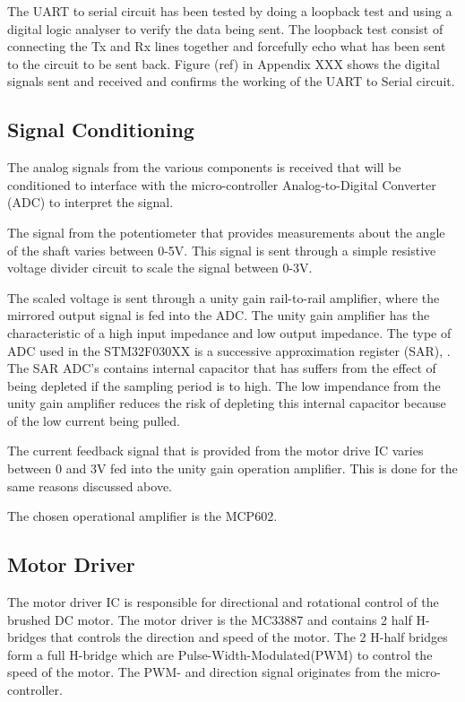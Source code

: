 \documentclass[a4paper,12pt]{article}
\begin{document}
	
	The UART to serial circuit has been tested by doing a loopback test and using a digital logic analyser to verify the data being sent. The loopback test consist of connecting the Tx and Rx lines together and forcefully echo what has been sent to the circuit to be sent back. Figure (ref) in Appendix XXX shows the digital signals sent and received and confirms the working of the UART to Serial circuit.
	
	\subsection{Signal Conditioning}
	
	The analog signals from the various components is received that will be conditioned to interface with the micro-controller Analog-to-Digital Converter (ADC) to interpret the signal.
	
	The signal from the potentiometer that provides measurements about the angle of the shaft varies between 0-5V. This signal is sent through a simple resistive voltage divider circuit to scale the signal between 0-3V. 
	
	The scaled voltage is sent through a unity gain rail-to-rail amplifier, where the mirrored output signal is fed into the ADC. The unity gain amplifier has the characteristic of a high input impedance and low output impedance. The type of ADC used in the STM32F030XX is a successive approximation register (SAR), \cite{stm32_ADC:2017}. The SAR ADC's contains internal capacitor that has suffers from the effect of being depleted if the sampling period is to high. The low impendance from the unity gain amplifier reduces the risk of depleting this internal capacitor because of the low current being pulled.
	
	The current feedback signal that is provided from the motor drive IC varies between 0 and 3V fed into the unity gain operation amplifier. This is done for the same reasons discussed above.
	
	The chosen operational amplifier is the MCP602. 
	
	\subsection{Motor Driver}
	
	The motor driver IC is responsible for directional and rotational control of the brushed DC motor. The motor driver is the MC33887 and contains 2 half H-bridges that controls the direction and speed of the motor. The 2 H-half bridges form a full H-bridge which are Pulse-Width-Modulated(PWM) to control the speed of the motor. The PWM- and direction signal originates from the micro-controller. 
	
\end{document}

